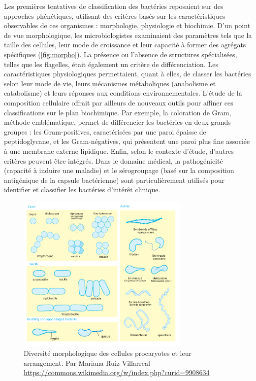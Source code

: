 Les premières tentatives de classification des bactéries reposaient sur des approches phénétiques, utilisant des critères basés sur les caractéristiques observables de ces organismes : morphologie, physiologie et biochimie.
D'un point de vue morphologique, les microbiologistes examinaient des paramètres tels que la taille des cellules, leur mode de croissance et leur capacité à former des agrégats spécifiques (\autoref{fig:morpho}). La présence ou l'absence de structures spécialisées, telles que les flagelles, était également un critère de différenciation. 
Les caractéristiques physiologiques permettaient, quant à elles, de classer les bactéries selon leur mode de vie, leurs mécanismes métaboliques (anabolisme et catabolisme) et leurs réponses aux conditions environnementales.
L'étude de la composition cellulaire offrait par ailleurs de nouveaux outils pour affiner ces classifications sur le plan biochimique. Par exemple, la coloration de Gram, méthode emblématique, permet de différencier les bactéries en deux grands groupes : les Gram-positives, caractérisées par une paroi épaisse de peptidoglycane, et les Gram-négatives, qui présentent une paroi plus fine associée à une membrane externe lipidique.
Enfin, selon le contexte d’étude, d'autres critères peuvent être intégrés. Dans le domaine médical, la pathogénicité (capacité à induire une maladie) et le sérogroupage (basé sur la composition antigénique de la capsule bactérienne) sont particulièrement utilisés pour identifier et classifier les bactéries d'intérêt clinique.

\begin{figure}[htbp]
    \centering
    \includegraphics[width=0.75\textwidth, keepaspectratio]{images/Bacterial_morphology_diagram-fr.png}
    \caption[Morphologie et arrangement cellulaire procaryote]{Diversité morphologique des cellules procaryotes et leur arrangement. Par Mariana Ruiz Villarreal \url{https://commons.wikimedia.org/w/index.php?curid=9908634}}
    \label{fig:morpho}
\end{figure}

